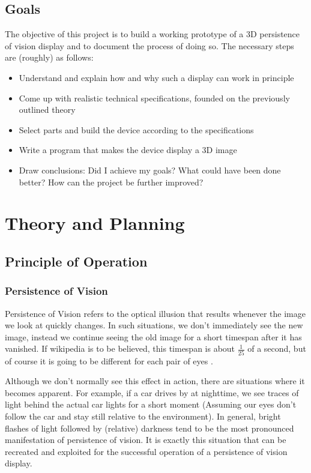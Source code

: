 \documentclass[a4paper, 11pt, titlepage]{report}
\begin{document}
\section{Goals}

The objective of this project is to build a working prototype of a 3D persistence of vision
display and to document the process of doing so. The necessary steps are (roughly) as follows:

\begin{itemize}
\item Understand and explain how and why such a display can work in principle
\item Come up with realistic technical specifications, founded on the previously outlined
theory
\item Select parts and build the device according to the specifications
\item Write a program that makes the device display a 3D image
\item Draw conclusions: Did I achieve my goals? What could have been done better?
How can the project be further improved?
\end{itemize}





\chapter{Theory and Planning}

\section{Principle of Operation}

\subsection{Persistence of Vision}

Persistence of Vision refers to the optical illusion that results whenever the image we look
at quickly changes. In such situations, we don't immediately see the new image, instead we
continue seeing the old image for a short timespan after it has vanished. If wikipedia is to
be believed, this timespan is about $\frac{1}{25}$ of a second, but of course it is going to
be different for each pair of eyes \cite{povwiki}.

Although we don't normally see this effect in action, there are situations where it becomes
apparent. For example, if a car drives by at nighttime, we see traces of light behind the
actual car lights for a short moment (Assuming our eyes don't follow the car and stay still
relative to the environment). In general, bright flashes of light followed by (relative)
darkness tend to be the most pronounced manifestation of persistence of vision. It is exactly
this situation that can be recreated and exploited for the successful operation of a persistence
of vision display.
\end{document}
